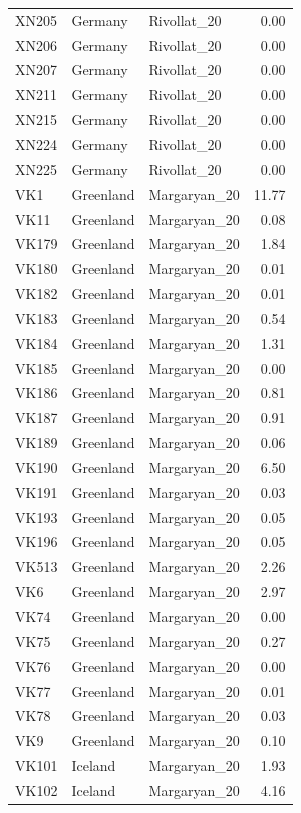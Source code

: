 \begin{longtable}[t]{lllr}
XN205 & Germany & Rivollat\_20 & 0.00\\
XN206 & Germany & Rivollat\_20 & 0.00\\
XN207 & Germany & Rivollat\_20 & 0.00\\
XN211 & Germany & Rivollat\_20 & 0.00\\
XN215 & Germany & Rivollat\_20 & 0.00\\
XN224 & Germany & Rivollat\_20 & 0.00\\
XN225 & Germany & Rivollat\_20 & 0.00\\
VK1 & Greenland & Margaryan\_20 & 11.77\\
VK11 & Greenland & Margaryan\_20 & 0.08\\
VK179 & Greenland & Margaryan\_20 & 1.84\\
VK180 & Greenland & Margaryan\_20 & 0.01\\
VK182 & Greenland & Margaryan\_20 & 0.01\\
VK183 & Greenland & Margaryan\_20 & 0.54\\
VK184 & Greenland & Margaryan\_20 & 1.31\\
VK185 & Greenland & Margaryan\_20 & 0.00\\
VK186 & Greenland & Margaryan\_20 & 0.81\\
VK187 & Greenland & Margaryan\_20 & 0.91\\
VK189 & Greenland & Margaryan\_20 & 0.06\\
VK190 & Greenland & Margaryan\_20 & 6.50\\
VK191 & Greenland & Margaryan\_20 & 0.03\\
VK193 & Greenland & Margaryan\_20 & 0.05\\
VK196 & Greenland & Margaryan\_20 & 0.05\\
VK513 & Greenland & Margaryan\_20 & 2.26\\
VK6 & Greenland & Margaryan\_20 & 2.97\\
VK74 & Greenland & Margaryan\_20 & 0.00\\
VK75 & Greenland & Margaryan\_20 & 0.27\\
VK76 & Greenland & Margaryan\_20 & 0.00\\
VK77 & Greenland & Margaryan\_20 & 0.01\\
VK78 & Greenland & Margaryan\_20 & 0.03\\
VK9 & Greenland & Margaryan\_20 & 0.10\\
VK101 & Iceland & Margaryan\_20 & 1.93\\
VK102 & Iceland & Margaryan\_20 & 4.16\\

\end{longtable}
